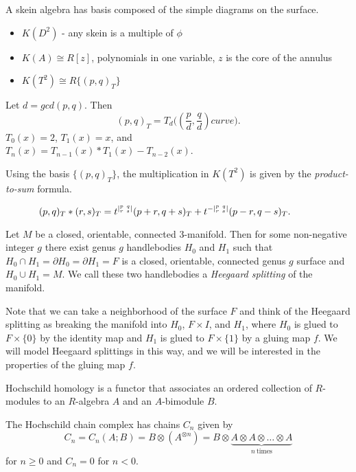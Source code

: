 \documentclass{slides}
\newcommand{\ot}{\otimes}
\begin{document}
\begin{slide}
A skein algebra has basis composed of
the simple diagrams on the surface.

\begin{itemize}
\item $K(D^2)$ - any skein is a multiple of $\phi$
\item $K(A) \cong R[z]$, polynomials in one variable,
		$z$ is the core of the annulus
\item $K(T^2) \cong R\{(p,q)_T\}$
\end{itemize}

Let $d = gcd(p,q)$.  Then $$(p,q)_T = T_d \Big( \left( \frac{p}{d}, \frac{q}{d} \right) curve \Big).$$
$T_0(x) = 2$, $T_1(x) = x$, and \\ $T_n(x) = T_{n-1}(x)*T_1(x) - T_{n-2}(x)$.
\end{slide}

\begin{slide}
Using the basis $\{(p,q)_T\}$, the multiplication in
$K(T^2)$ is given by
the \textit{product-to-sum} formula.

\[ \hspace{-1cm}
(p,q)_T * (r,s)_T = t^{|^{p~q}_{r~s}|}
(p+r,q+s)_T + t^{-|^{p~q}_{r~s}|}
(p-r, q-s)_T.
\]

\end{slide}

\begin{slide}
Let $M$ be a closed, orientable, connected 3-manifold.
Then for some non-negative integer $g$ there exist
genus $g$ handlebodies $H_0$ and $H_1$ such that
$H_0 \cap H_1 = \partial H_0 = \partial H_1 = F$
is a closed, orientable, connected genus $g$ surface
and $H_0 \cup H_1 = M$.
We call these two handlebodies a
\textit{Heegaard splitting} of the manifold.

Note that we can take a neighborhood
of the surface $F$ and think of the Heegaard splitting as breaking
the manifold into $H_0$, $F \times I$, and $H_1$, where $H_0$ is
glued to $F \times \{0\}$ by the identity map
and $H_1$ is glued to $F \times \{1\}$ by a gluing map $f$.
We will model Heegaard splittings in this way, and we will be
interested in the properties of the gluing map $f$.
\end{slide}

\begin{slide}
Hochschild homology is a functor that associates an ordered
collection of $R$-modules to an $R$-algebra $A$ and an
$A$-bimodule $B$.

The Hochschild chain complex has chains
$C_n$ given by
\[
C_n = C_n(A; B) = B \ot (A^{\ot n}) = B \ot 
\underbrace{A \ot A \ot \dots \ot A}_{n~\mathrm{times}}
\]
for $n \geq 0$ and
$C_n = 0$ for $n < 0$.
\end{slide}
\end{document}
